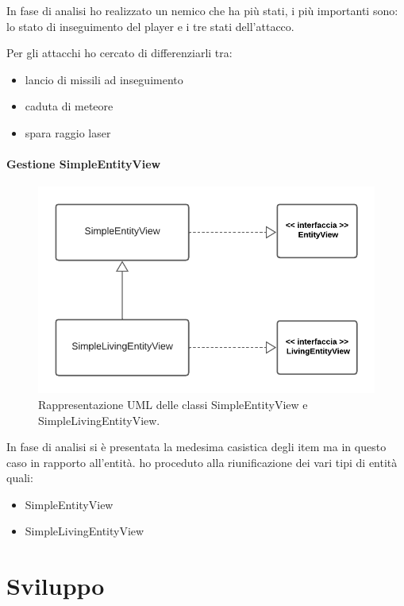 \documentclass[a4paper,12pt]{report}
\begin{document}
    In fase di analisi ho realizzato un nemico che ha più stati, i più importanti sono: lo stato di inseguimento del player e i tre stati dell'attacco.

    Per gli attacchi ho cercato di differenziarli tra:

    \begin{itemize}
        \item lancio di missili ad inseguimento
        \item caduta di meteore
        \item spara raggio laser
    \end{itemize}

    \subsubsection{Gestione SimpleEntityView}

    \begin{figure}[H]
        \centering{}
        \includegraphics[scale=1] {img/entities-view.png}
        \caption{Rappresentazione UML delle classi SimpleEntityView e SimpleLivingEntityView.}
        \label{img:entities-view}
    \end{figure}

    In fase di analisi si è presentata la medesima casistica degli item ma in questo caso in rapporto all'entità. ho proceduto alla riunificazione dei vari tipi di entità quali:

    \begin{itemize}
        \item SimpleEntityView
        \item SimpleLivingEntityView
    \end{itemize}

    \chapter{Sviluppo}
\end{document}
